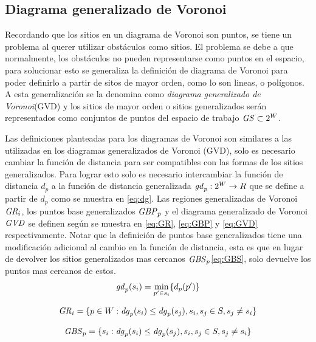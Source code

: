 \subsection{Diagrama generalizado de Voronoi}\cite{choset2005principles}\cite{latombe1991}\cite{wurm2008coordinated}
Recordando que los sitios en un diagrama de Voronoi son puntos, se tiene un problema al querer utilizar obstáculos como sitios. El problema se debe a que normalmente, los obstáculos no pueden representarse como puntos en el espacio, para solucionar esto se generaliza la definición de diagrama de Voronoi para poder definirlo a partir de sitos de mayor orden, como lo son lineas, o polígonos. A esta generalización se la denomina como \emph{diagrama generalizado de Voronoi}(GVD) y los sitios de mayor orden o sitios generalizados serán representados como conjuntos de puntos del espacio de trabajo $\mathit{GS}\subset 2^{W}$.

Las definiciones planteadas para los diagramas de Voronoi son similares a las utilizadas en los diagramas generalizados de Voronoi (GVD), solo es necesario cambiar la función de distancia para ser compatibles con las formas de los sitios generalizados. Para lograr esto solo es necesario intercambiar la función de distancia $d_p$ a la función de distancia generalizada $\mathit{gd}_p : 2^{W} \rightarrow R$ que se define a partir de $d_p$ como se muestra en \ref{eq:dg}. Las regiones generalizadas de Voronoi $\mathit{GR}_i$, los puntos base generalizados $\mathit{GBP}_p$ y el diagrama generalizado de Voronoi $\mathit{GVD}$ se definen según se muestra en \ref{eq:GR}, \ref{eq:GBP} y \ref{eq:GVD} respectivamente. Notar que la definición de puntos base generalizados tiene una modificación adicional al cambio en la función de distancia, esta es que en lugar de devolver los sitios generalizados mas cercanos $\mathit{GBS}_p$\ref{eq:GBS}, solo devuelve los puntos mas cercanos de estos.
\begin{equation}
  \mathit{gd}_p(s_i) = \min_{p'\in s_i}\{d_p(p')\} \label{eq:dg}
\end{equation}

\begin{equation}
  \mathit{GR}_i = \{p \in W : \mathit{dg}_p(s_i) \leq \mathit{dg}_p(s_j), s_i,s_j\in S,s_j \neq s_i\}\label{eq:GR}
\end{equation}

\begin{equation}
  \mathit{GBS}_p = \{s_i : \mathit{dg}_p(s_i) \leq \mathit{dg}_p(s_j), s_i,s_j\in S,s_j \neq s_i\}\label{eq:GBS}
\end{equation}

